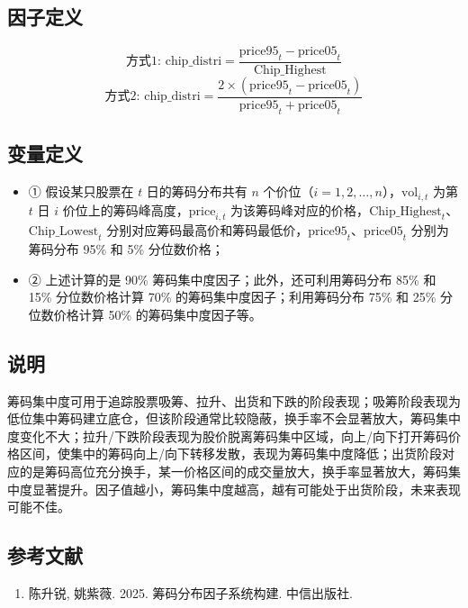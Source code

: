 \documentclass{article}
\begin{document}
\subsection{因子定义}
\begin{equation}
    \text{方式1: } \mathrm{chip\_distri} = \frac{\mathrm{price95}_t - \mathrm{price05}_t}{\mathrm{Chip\_Highest}}
\end{equation}
\begin{equation}
    \text{方式2: } \mathrm{chip\_distri} = \frac{2 \times (\mathrm{price95}_t - \mathrm{price05}_t)}{\mathrm{price95}_t + \mathrm{price05}_t}
\end{equation}

\subsection{变量定义}
\begin{itemize}
    \item ① 假设某只股票在 \( t \) 日的筹码分布共有 \( n \) 个价位（\( i = 1, 2, \ldots, n \)），\( \mathrm{vol}_{i,t} \) 为第 \( t \) 日 \( i \) 价位上的筹码峰高度，\( \mathrm{price}_{i,t} \) 为该筹码峰对应的价格，\( \mathrm{Chip\_Highest}_t \)、\( \mathrm{Chip\_Lowest}_t \) 分别对应筹码最高价和筹码最低价，\( \mathrm{price95}_t \)、\( \mathrm{price05}_t \) 分别为筹码分布 95\% 和 5\% 分位数价格；
    \item ② 上述计算的是 90\% 筹码集中度因子；此外，还可利用筹码分布 85\% 和 15\% 分位数价格计算 70\% 的筹码集中度因子；利用筹码分布 75\% 和 25\% 分位数价格计算 50\% 的筹码集中度因子等。
\end{itemize}

\subsection{说明}
筹码集中度可用于追踪股票吸筹、拉升、出货和下跌的阶段表现；吸筹阶段表现为低位集中筹码建立底仓，但该阶段通常比较隐蔽，换手率不会显著放大，筹码集中度变化不大；拉升/下跌阶段表现为股价脱离筹码集中区域，向上/向下打开筹码价格区间，使集中的筹码向上/向下转移发散，表现为筹码集中度降低；出货阶段对应的是筹码高位充分换手，某一价格区间的成交量放大，换手率显著放大，筹码集中度显著提升。因子值越小，筹码集中度越高，越有可能处于出货阶段，未来表现可能不佳。

\subsection{参考文献}
\begin{enumerate}
    \item 陈升锐, 姚紫薇. 2025. 筹码分布因子系统构建. 中信出版社.
\end{enumerate}
\end{document}
